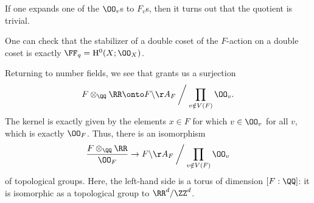 \documentclass[../notes.tex]{subfiles}
\begin{document}
\begin{remark}
	If one expands one of the $\OO_v$s to $F_v$s, then it turns out that the quotient is trivial.
\end{remark}
\begin{remark}
	One can check that the stabilizer of a double coset of the $F$-action on a double coset is exactly $\FF_q=\mathrm H^0(X;\OO_X)$.
\end{remark}
Returning to number fields, we see that  grants us a surjection
\[F\otimes_\QQ\RR\onto F\backslash\AA_F\mathbin{\bigg/}\prod_{v\notin V(F)}\OO_v.\]
The kernel is exactly given by the elements $x\in F$ for which $v\in\OO_v$ for all $v$, which is exactly $\OO_F$. Thus, there is an isomorphism
\[\frac{F\otimes_\QQ\RR}{\OO_F}\to F\backslash\AA_F\mathbin{\bigg/}\prod_{v\notin V(F)}\OO_v\]
of topological groups. Here, the left-hand side is a torus of dimension $[F:\QQ]$: it is isomorphic as a topological group to $\RR^d/\ZZ^d$.
\end{document}
